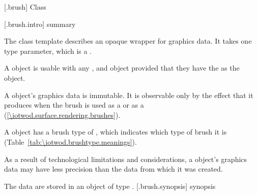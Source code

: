  [\iotwod.brush] {Class }

 [\iotwod.brush.intro] { summary}

\pnum
{}%
The class template  describes an opaque wrapper for graphics data. It takes one type parameter, which is a \graphicssurfacestemplparamnospace.

\pnum
A  object is usable with any  , and  object provided that they have the \graphicssurfacestemplparam as the  object.

\pnum
A  object's graphics data is immutable. It is observable only by the effect that it produces when the brush is used as a  or as a  (\ref{\iotwod.surface.rendering.brushes}).

\pnum
A  object has a brush type of , which indicates which type of brush it is (Table~\ref{tab:\iotwod.brushtype.meanings}).

\pnum
As a result of technological limitations and considerations, a  object's graphics data may have less precision than the data from which it was created.

\pnum
The data are stored in an object of type .
%
 [\iotwod.brush.synopsis] { synopsis}

